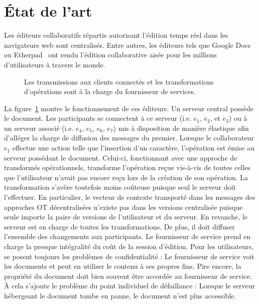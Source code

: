 
\section{État de l'art}

Les éditeurs collaboratifs répartis autorisant l'édition temps réel dans les
navigateurs web sont centralisés. Entre autres, les éditeurs tels que Google
Docs~\cite{googledocs} ou Etherpad~\cite{etherpad} ont rendu l'édition
collaborative aisée pour les millions d'utilisateurs à travers le monde.

\begin{figure}
  \begin{center}
    
    \caption{\label{editor:fig:serviceprovider} Les transmissions aux clients
      connectés et les transformations d'opérations sont à la charge du 
      fournisseur de services.}
  \end{center}
\end{figure}

La figure~\ref{editor:fig:serviceprovider} montre le fonctionnement de ces
éditeurs. Un serveur central possède le document. Les participants se connectent
à ce serveur (i.e. $e_1$, $e_2$, et $e_3$) ou à un serveur associé (i.e. $e_4$,
$e_5$, $e_6$, $e_7$) mis à disposition de manière élastique afin d'alléger la
charge de diffusion des messages du premier. Lorsque le collaborateur $e_1$
effectue une action telle que l'insertion d'un caractère, l'opération est émise
au serveur possédant le document. Celui-ci, fonctionnant avec une approche de
transformés opérationnels, transforme l'opération reçue vis-à-vis de toutes
celles que l'utilisateur n'avait pas encore reçu lors de la création de son
opération. La transformation s'avère toutefois moins coûteuse puisque seul le
serveur doit l'effectuer. En particulier, le vecteur de contexte transporté dans
les messages des approches OT décentralisées n'existe pas dans les versions
centralisée puisque seule importe la paire de versions de l'utilisateur et du
serveur. En revanche, le serveur est en charge de toutes les transformations. De
plus, il doit diffuser l'ensemble des changements aux participants. Le
fournisseur de service prend en charge la presque intégralité du coût de la
session d'édition. Pour les utilisateurs, se posent toujours les problèmes de
confidentialité : Le fournisseur de service voit les documents et peut en
utiliser le contenu à ses propres fins. Pire encore, la propriété du document
doit bien souvent être accordée au fournisseur de service. À cela s'ajoute le
problème du point individuel de défaillance : Lorsque le serveur hébergeant le
document tombe en panne, le document n'est plus accessible.

